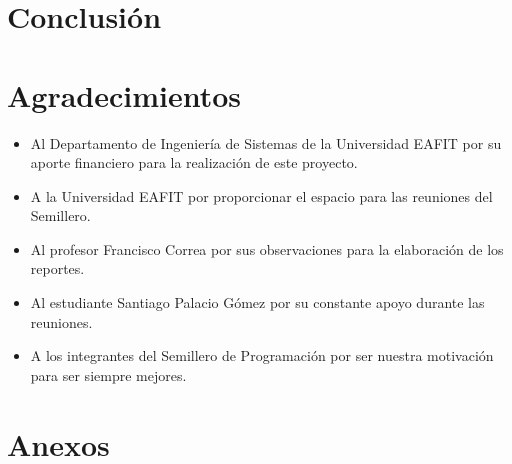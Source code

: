 \documentclass[conference]{IEEEtran}
\begin{document}
\section{Conclusión}

\section{Agradecimientos}
\begin{itemize}
	\item Al Departamento de Ingeniería de Sistemas de la Universidad EAFIT por su aporte financiero para la realización de este proyecto.
	\item A la Universidad EAFIT por proporcionar el espacio para las reuniones del Semillero.
	\item Al profesor Francisco Correa por sus observaciones para la elaboración de los reportes.
	\item Al estudiante Santiago Palacio Gómez por su constante apoyo durante las reuniones.
	\item A los integrantes del Semillero de Programación por ser nuestra motivación para ser siempre mejores.
\end{itemize}

\nocite{*}




\section*{Anexos}
\end{document}
